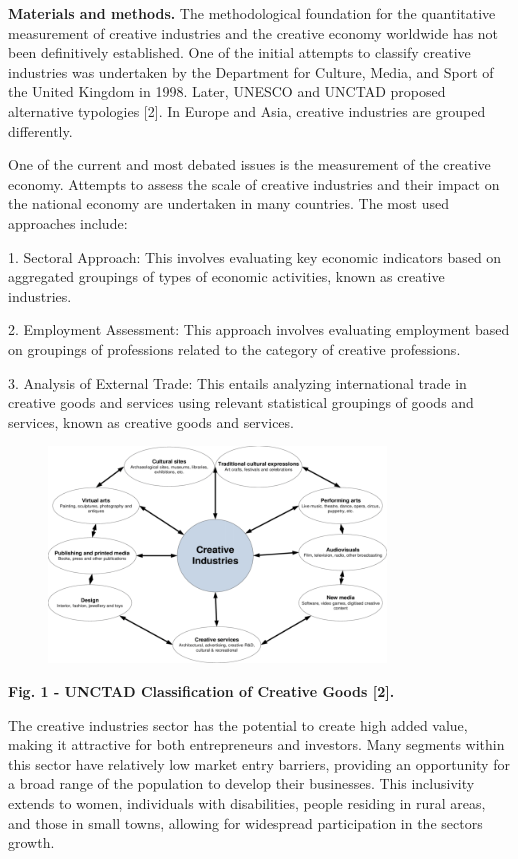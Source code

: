 {\bfseries Materials and methods.} The methodological foundation for the
quantitative measurement of creative industries and the creative economy
worldwide has not been definitively established. One of the initial
attempts to classify creative industries was undertaken by the
Department for Culture, Media, and Sport of the United Kingdom in 1998.
Later, UNESCO and UNCTAD proposed alternative typologies {[}2{]}. In
Europe and Asia, creative industries are grouped differently.

One of the current and most debated issues is the measurement of the
creative economy. Attempts to assess the scale of creative industries
and their impact on the national economy are undertaken in many
countries. The most used approaches include:

1. Sectoral Approach: This involves evaluating key economic indicators
based on aggregated groupings of types of economic activities, known as
creative industries.

2. Employment Assessment: This approach involves evaluating employment
based on groupings of professions related to the category of creative
professions.

3. Analysis of External Trade: This entails analyzing international
trade in creative goods and services using relevant statistical
groupings of goods and services, known as creative goods and services.

\begin{figure}[H]
	\centering
	\includegraphics[width=0.8\textwidth]{assets/1120}
	\caption*{}
\end{figure}

{\bfseries Fig. 1 - UNCTAD Classification of Creative Goods {[}2{]}.}

The creative industries sector has the potential to create high added
value, making it attractive for both entrepreneurs and investors. Many
segments within this sector have relatively low market entry barriers,
providing an opportunity for a broad range of the population to develop
their businesses. This inclusivity extends to women, individuals with
disabilities, people residing in rural areas, and those in small towns,
allowing for widespread participation in the sector\textquotesingle s
growth.

